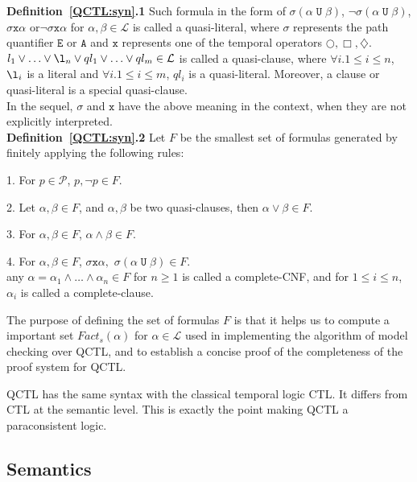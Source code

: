 \documentclass{entcs}
\begin{document}
\noindent\textbf{Definition~\ref{QCTL:syn}.1} Such formula in the
form of $\sigma ( \alpha\;\texttt{U}\;\beta)$, $\neg\sigma (
\alpha\;\texttt{U}\;\beta)$, $\sigma\texttt{x}\alpha\mbox{ or
}\neg\sigma\texttt{x}\alpha$ for $\alpha,\beta\in\mathcal{L}$ is
called a quasi-literal, where $\sigma$ represents the path
quantifier $\texttt{E}$ or $\texttt{A}$ and $\texttt{x}$
represents one of the temporal operators
$\bigcirc,\Box,\diamondsuit$. $l_1\vee\ldots\vee\l_n\vee
ql_1\vee\ldots\vee ql_m
  \in\mathcal{L}$ is called a quasi-clause,
where $\forall i. 1\leq i\leq n$, $\l_i$ is a literal and
$\forall i. 1\leq i\leq m$, $ql_i$ is a quasi-literal. Moreover,
a clause or quasi-literal is a special quasi-clause.\\

In the sequel, $\sigma$ and $\texttt{x}$ have the above meaning in
the context, when they are not explicitly interpreted.\\

\noindent\textbf{Definition~\ref{QCTL:syn}.2} Let $F$ be the
smallest set of formulas generated by finitely applying the
following rules:

1. For $p\in\mathcal{P}$, $p,\neg p\in F$.

2. Let $\alpha,\beta\in F$, and $\alpha,\beta$ be two
quasi-clauses, then $\alpha\vee\beta\in F.$

3. For $\alpha,\beta\in F$, $\alpha\wedge \beta\in F$.

4. For $\alpha,\beta\in F$, $\sigma\texttt{x}\alpha,$ $\sigma
(\alpha\;\texttt{U}\;\beta)\in F$.\\


any $\alpha=\alpha_1\wedge\ldots\wedge\alpha_n\in F$ for $n\geq 1$
is called a complete-CNF, and for $1\leq i\leq n$, $\alpha_i$ is
called a complete-clause.

The purpose of defining the set of formulas $F$ is that it helps
us to compute a important set $Fact_s(\alpha)$ for $\alpha\in
\mathcal{L}$ used in implementing the algorithm of model checking
over QCTL, and to establish a concise proof of the completeness of
the proof system for QCTL.

QCTL has the same syntax with the classical temporal logic CTL. It
differs from CTL at the semantic level. This is exactly the point
making QCTL a paraconsistent logic.

\subsection{Semantics}\label{QCTL:sem}
\end{document}
